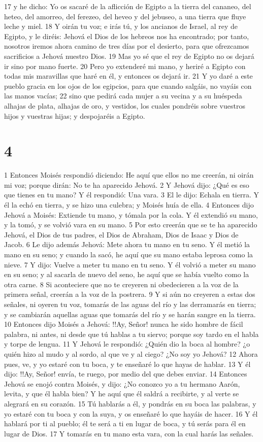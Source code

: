 17 y he dicho: Yo os sacaré de la aflicción de Egipto a la tierra del cananeo, del heteo, del amorreo, del ferezeo, del heveo y del jebuseo, a una tierra que fluye leche y miel.
18 Y oirán tu voz; e irás tú, y los ancianos de Israel, al rey de Egipto, y le diréis: Jehová el Dios de los hebreos nos ha encontrado; por tanto, nosotros iremos ahora camino de tres días por el desierto, para que ofrezcamos sacrificios a Jehová nuestro Dios.
19 Mas yo sé que el rey de Egipto no os dejará ir sino por mano fuerte.
20 Pero yo extenderé mi mano, y heriré a Egipto con todas mis maravillas que haré en él, y entonces os dejará ir.
21 Y yo daré a este pueblo gracia en los ojos de los egipcios, para que cuando salgáis, no vayáis con las manos vacías;
22 sino que pedirá cada mujer a su vecina y a su huéspeda alhajas de plata, alhajas de oro, y vestidos, los cuales pondréis sobre vuestros hijos y vuestras hijas; y despojaréis a Egipto.

\chapter{4}

1 Entonces Moisés respondió diciendo: He aquí que ellos no me creerán, ni oirán mi voz; porque dirán: No te ha aparecido Jehová.
2 Y Jehová dijo: ¿Qué es eso que tienes en tu mano? Y él respondió: Una vara.
3 El le dijo: Echala en tierra. Y él la echó en tierra, y se hizo una culebra; y Moisés huía de ella.
4 Entonces dijo Jehová a Moisés: Extiende tu mano, y tómala por la cola. Y él extendió su mano, y la tomó, y se volvió vara en su mano.
5 Por esto creerán que se te ha aparecido Jehová, el Dios de tus padres, el Dios de Abraham, Dios de Isaac y Dios de Jacob.
6 Le dijo además Jehová: Mete ahora tu mano en tu seno. Y él metió la mano en su seno; y cuando la sacó, he aquí que su mano estaba leprosa como la nieve.
7 Y dijo: Vuelve a meter tu mano en tu seno. Y él volvió a meter su mano en su seno; y al sacarla de nuevo del seno, he aquí que se había vuelto como la otra carne.
8 Si aconteciere que no te creyeren ni obedecieren a la voz de la primera señal, creerán a la voz de la postrera.
9 Y si aún no creyeren a estas dos señales, ni oyeren tu voz, tomarás de las aguas del río y las derramarás en tierra; y se cambiarán aquellas aguas que tomarás del río y se harán sangre en la tierra.
10 Entonces dijo Moisés a Jehová: !!Ay, Señor! nunca he sido hombre de fácil palabra, ni antes, ni desde que tú hablas a tu siervo; porque soy tardo en el habla y torpe de lengua.
11 Y Jehová le respondió: ¿Quién dio la boca al hombre? ¿o quién hizo al mudo y al sordo, al que ve y al ciego? ¿No soy yo Jehová?
12 Ahora pues, ve, y yo estaré con tu boca, y te enseñaré lo que hayas de hablar.
13 Y él dijo: !!Ay, Señor! envía, te ruego, por medio del que debes enviar.
14 Entonces Jehová se enojó contra Moisés, y dijo: ¿No conozco yo a tu hermano Aarón, levita, y que él habla bien? Y he aquí que él saldrá a recibirte, y al verte se alegrará en su corazón.
15 Tú hablarás a él, y pondrás en su boca las palabras, y yo estaré con tu boca y con la suya, y os enseñaré lo que hayáis de hacer.
16 Y él hablará por ti al pueblo; él te será a ti en lugar de boca, y tú serás para él en lugar de Dios.
17 Y tomarás en tu mano esta vara, con la cual harás las señales.

